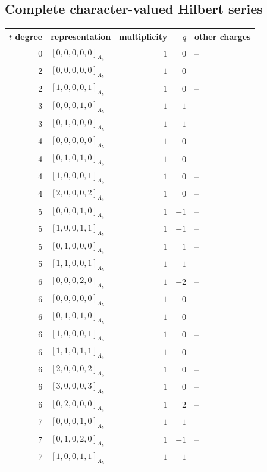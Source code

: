 \documentclass[11pt]{article}
\newcommand{\Dynkin}[1]{#1}
\begin{document}
\subsection{Complete character-valued Hilbert series}
\begin{longtable}{r l r r l}
\toprule $t$ degree & representation & multiplicity & $q$ & other charges\\\midrule\endhead
0 & $\Dynkin{[0,0,0,0,0]_{A_5}}$ & $1$ & $0$ & --\\
2 & $\Dynkin{[0,0,0,0,0]_{A_5}}$ & $1$ & $0$ & --\\
2 & $\Dynkin{[1,0,0,0,1]_{A_5}}$ & $1$ & $0$ & --\\
3 & $\Dynkin{[0,0,0,1,0]_{A_5}}$ & $1$ & $-1$ & --\\
3 & $\Dynkin{[0,1,0,0,0]_{A_5}}$ & $1$ & $1$ & --\\
4 & $\Dynkin{[0,0,0,0,0]_{A_5}}$ & $1$ & $0$ & --\\
4 & $\Dynkin{[0,1,0,1,0]_{A_5}}$ & $1$ & $0$ & --\\
4 & $\Dynkin{[1,0,0,0,1]_{A_5}}$ & $1$ & $0$ & --\\
4 & $\Dynkin{[2,0,0,0,2]_{A_5}}$ & $1$ & $0$ & --\\
5 & $\Dynkin{[0,0,0,1,0]_{A_5}}$ & $1$ & $-1$ & --\\
5 & $\Dynkin{[1,0,0,1,1]_{A_5}}$ & $1$ & $-1$ & --\\
5 & $\Dynkin{[0,1,0,0,0]_{A_5}}$ & $1$ & $1$ & --\\
5 & $\Dynkin{[1,1,0,0,1]_{A_5}}$ & $1$ & $1$ & --\\
6 & $\Dynkin{[0,0,0,2,0]_{A_5}}$ & $1$ & $-2$ & --\\
6 & $\Dynkin{[0,0,0,0,0]_{A_5}}$ & $1$ & $0$ & --\\
6 & $\Dynkin{[0,1,0,1,0]_{A_5}}$ & $1$ & $0$ & --\\
6 & $\Dynkin{[1,0,0,0,1]_{A_5}}$ & $1$ & $0$ & --\\
6 & $\Dynkin{[1,1,0,1,1]_{A_5}}$ & $1$ & $0$ & --\\
6 & $\Dynkin{[2,0,0,0,2]_{A_5}}$ & $1$ & $0$ & --\\
6 & $\Dynkin{[3,0,0,0,3]_{A_5}}$ & $1$ & $0$ & --\\
6 & $\Dynkin{[0,2,0,0,0]_{A_5}}$ & $1$ & $2$ & --\\
7 & $\Dynkin{[0,0,0,1,0]_{A_5}}$ & $1$ & $-1$ & --\\
7 & $\Dynkin{[0,1,0,2,0]_{A_5}}$ & $1$ & $-1$ & --\\
7 & $\Dynkin{[1,0,0,1,1]_{A_5}}$ & $1$ & $-1$ & --\\

\end{longtable}
\end{document}
